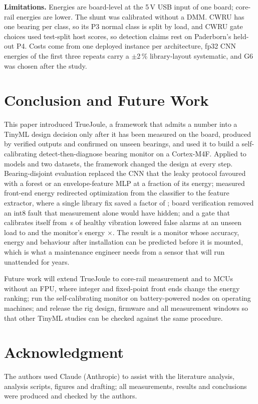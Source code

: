 \documentclass[conference]{IEEEtran}
\newcommand{\TJ}{TrueJoule}
\begin{document}
\textbf{Limitations.} Energies are board-level at the 5\,V USB input of one board; core-rail energies are lower. The
shunt was calibrated without a DMM. CWRU has one bearing per class, so its P3 normal class is split by load, and CWRU
gate choices used test-split host scores, so detection claims rest on Paderborn's held-out P4. Costs come from one
deployed instance per architecture, fp32 CNN energies of the first three repeats carry a $\pm$2\,\% library-layout
systematic, and G6 was chosen after the study.

\section{Conclusion and Future Work}\label{sec:concl}
This paper introduced \TJ{}, a framework that admits a number into a TinyML design decision only after it has been
measured on the board, produced by verified outputs and confirmed on unseen bearings, and used it to build a
self-calibrating detect-then-diagnose bearing monitor on a Cortex-M4F. Applied to \NumCwruNModels{} models and two
datasets, the framework changed the design at every step. Bearing-disjoint evaluation replaced the CNN that the leaky
protocol favoured with a forest or an envelope-feature MLP at a fraction of its energy; measured front-end energy
redirected optimization from the classifier to the feature extractor, where a single library fix saved a factor of
\NumCwruLfFactorRThree; board verification removed an int8 fault that measurement alone would have hidden; and a
gate that calibrates itself from \NumCasCalibSixteenS\,s of healthy vibration lowered false alarms at an unseen load
to \NumCasCwGFivenOneSixFpr{} and the monitor's energy \NumCasCwSaving$\times$. The result is a monitor whose accuracy,
energy and behaviour after installation can be predicted before it is mounted, which is what a maintenance engineer
needs from a sensor that will run unattended for years.

Future work will extend \TJ{} to core-rail measurement and to MCUs without an FPU, where integer and fixed-point front
ends change the energy ranking; run the self-calibrating monitor on battery-powered nodes on operating machines; and
release the rig design, firmware and all \NumTotWindows{} measurement windows so that other TinyML studies can be
checked against the same procedure.

\section*{Acknowledgment}
The authors used Claude (Anthropic) to assist with the literature analysis, analysis scripts, figures and drafting;
all measurements, results and conclusions were produced and checked by the authors.



\end{document}
